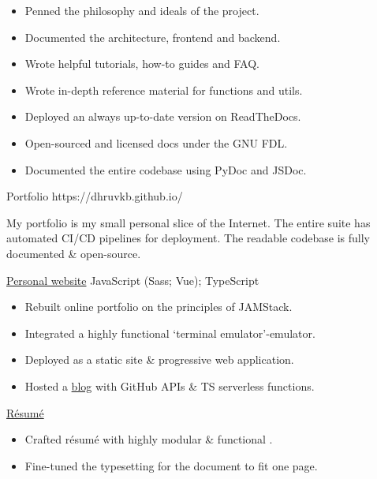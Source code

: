 \begin{sectiondescription}
  \begin{itemize}[nosep, leftmargin = *]
    \item Penned the philosophy and ideals of the project.
    \item Documented the architecture, frontend and backend.
    \item Wrote helpful tutorials, how-to guides and FAQ.
    \item Wrote in-depth reference material for functions and utils.
    \item Deployed an always up-to-date version on ReadTheDocs.
    \item Open-sourced and licensed docs under the GNU FDL.
    \item Documented the entire codebase using PyDoc and JSDoc.
  \end{itemize}
\end{sectiondescription}


\projectsubsection
  {Portfolio}
  {}
  {https://dhruvkb.github.io/}

\begin{sectiondescription}
  My portfolio is my small personal slice of the Internet. The entire suite has
  automated CI/CD pipelines for deployment. The readable codebase is fully
  documented \& open-source.
\end{sectiondescription}

\projectsubsubsection
  {\href{https://github.com/dhruvkb/portfolio/}{Personal website}}
  {JavaScript (Sass; Vue); TypeScript}

\begin{sectiondescription}
  \begin{itemize}[nosep, leftmargin = *]
    \item Rebuilt online portfolio on the principles of JAMStack.
    \item Integrated a highly functional `terminal emulator'-emulator.
    \item Deployed as a static site \& progressive web application.
    \item Hosted a \href{https://dhruvkb.github.io/#/blog}{blog} with GitHub APIs \& TS serverless functions.
  \end{itemize}
\end{sectiondescription}

\projectsubsubsection
  {\href{https://github.com/dhruvkb/resume/}{Résumé}}
  {\prettylatex}

\begin{sectiondescription}
  \begin{itemize}[nosep, leftmargin = *]
    \item Crafted résumé with highly modular \& functional \prettylatex{}.
    \item Fine-tuned the typesetting for the document to fit one page.
  \end{itemize}
\end{sectiondescription}
